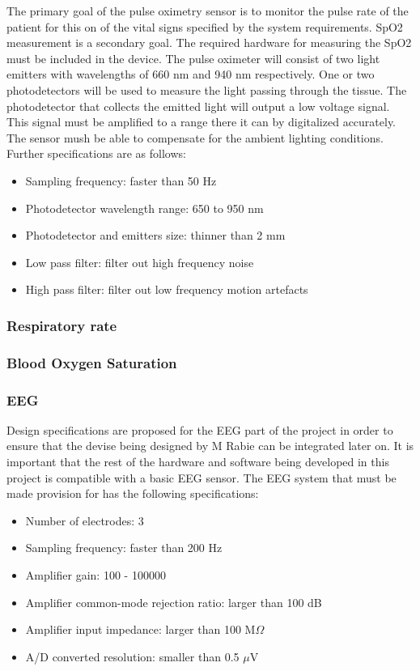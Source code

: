 The primary goal of the pulse oximetry sensor is to monitor the pulse rate of the patient for this on of the vital signs specified by the system requirements. SpO2 measurement is a secondary goal. The required hardware for measuring the SpO2 must be included in the device. The pulse oximeter will consist of two light emitters with wavelengths of 660 nm and 940 nm respectively. One or two photodetectors will be used to measure the light passing through the tissue. The photodetector that collects the emitted light will output a low voltage signal. This signal must be amplified to a range there it can by digitalized accurately. The sensor mush be able to compensate for the ambient lighting conditions. Further specifications are as follows:

\begin{itemize}
  \item Sampling frequency: faster than 50 Hz
  \item Photodetector wavelength range: 650 to 950 nm
  \item Photodetector and emitters size: thinner than 2 mm
  \item Low pass filter: filter out high frequency noise
  \item High pass filter: filter out low frequency motion artefacts
\end{itemize}









\subsubsection{Respiratory rate}

\subsubsection{Blood Oxygen Saturation}

\subsubsection{EEG}
Design specifications are proposed for the EEG part of the project in order to ensure that the devise being designed by M Rabie can be integrated later on. It is important that the rest of the hardware and software being developed in this project is compatible with a basic EEG sensor. The EEG system that must be made provision for has the following specifications:
\begin{itemize}
  \item Number of electrodes: 3
  \item Sampling frequency: faster than 200 Hz
  \item Amplifier gain: 100 - 100000
  \item Amplifier common-mode rejection ratio: larger than 100 dB
  \item Amplifier input impedance: larger than 100 M$\Omega$
  \item A/D converted resolution: smaller than 0.5 $\mu$V
\end{itemize}




